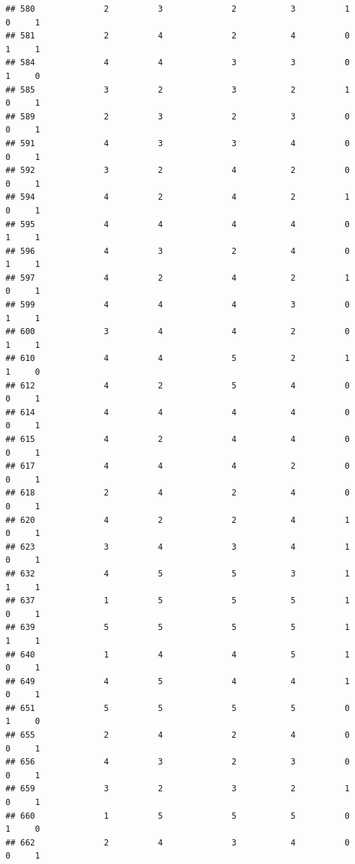 \documentclass[
]{article}
\begin{document}
\begin{verbatim}
## 580              2          3              2           3          1    0     1
## 581              2          4              2           4          0    1     1
## 584              4          4              3           3          0    1     0
## 585              3          2              3           2          1    0     1
## 589              2          3              2           3          0    0     1
## 591              4          3              3           4          0    0     1
## 592              3          2              4           2          0    0     1
## 594              4          2              4           2          1    0     1
## 595              4          4              4           4          0    1     1
## 596              4          3              2           4          0    1     1
## 597              4          2              4           2          1    0     1
## 599              4          4              4           3          0    1     1
## 600              3          4              4           2          0    1     1
## 610              4          4              5           2          1    1     0
## 612              4          2              5           4          0    0     1
## 614              4          4              4           4          0    0     1
## 615              4          2              4           4          0    0     1
## 617              4          4              4           2          0    0     1
## 618              2          4              2           4          0    0     1
## 620              4          2              2           4          1    0     1
## 623              3          4              3           4          1    0     1
## 632              4          5              5           3          1    1     1
## 637              1          5              5           5          1    0     1
## 639              5          5              5           5          1    1     1
## 640              1          4              4           5          1    0     1
## 649              4          5              4           4          1    0     1
## 651              5          5              5           5          0    1     0
## 655              2          4              2           4          0    0     1
## 656              4          3              2           3          0    0     1
## 659              3          2              3           2          1    0     1
## 660              1          5              5           5          0    1     0
## 662              2          4              3           4          0    0     1

\end{verbatim}
\end{document}

